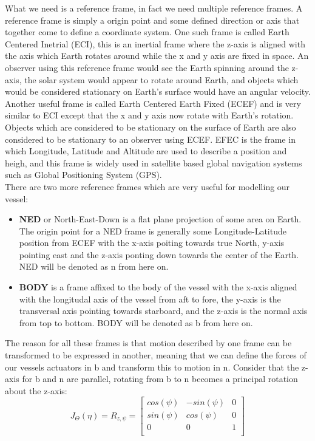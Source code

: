 What we need is a reference frame, in fact we need multiple reference frames. A reference frame is simply a origin point and some defined direction or axis that together
come to define a coordinate system. One such frame is called Earth Centered Inetrial (ECI), this is an inertial frame where the z-axis is aligned with the axis which Earth
rotates around while the x and y axis are fixed in space. An observer using this reference frame would see the Earth spinning around the z-axis, the solar system would appear
to rotate around Earth, and objects which would be considered stationary on Earth's surface would have an angular velocity. Another useful frame is called
Earth Centered Earth Fixed (ECEF) and is very similar to ECI except that the x and y axis now rotate with Earth's rotation. Objects which are considered to be stationary on
the surface of Earth are also considered to be stationary to an observer using ECEF. EFEC is the frame in which Longitude, Latitude and Altitude are used to describe
a position and heigh, and this frame is widely used in satellite based global navigation systems such as Global Positioning System (GPS).
\\
There are two more reference frames which are very useful for modelling our vessel:
\begin{itemize}
    \item \textbf{NED} or North-East-Down is a flat plane projection of some area on Earth. The origin point for a NED frame is generally some Longitude-Latitude
    position from ECEF with the x-axis poiting towards true North, y-axis pointing east and the z-axis ponting down towards the center of the Earth. NED will be denoted as
    {n} from here on.
    \item \textbf{BODY} is a frame affixed to the body of the vessel with the x-axis aligned with the longitudal axis of the vessel from aft to fore, 
    the y-axis is the transversal axis pointing towards starboard, and the z-axis is the normal axis from top to bottom. BODY will be denoted as {b} from here on.
\end{itemize}

The reason for all these frames is that motion described by one frame can be transformed to be expressed in another, meaning that we can define the forces of our
vessels actuators in {b} and transform this to motion in {n}. Consider that the z-axis for {b} and {n} are parallel, rotating from {b} to {n} becomes
a principal rotation about the z-axis:
\begin{equation}
    \label{eq:principal rotation}
    J_{\Theta}(\eta) = R_{z,\psi} = \begin{bmatrix}
        cos(\psi) & -sin(\psi) & 0\\
        sin(\psi) & cos(\psi) & 0\\
        0 & 0  & 1\\
    \end{bmatrix} 
\end{equation}

